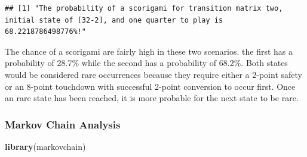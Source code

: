 \documentclass[
]{article}
\newenvironment{Shaded}{\begin{snugshade}}{\end{snugshade}}
\newcommand{\CommentTok}[1]{\textcolor[rgb]{0.56,0.35,0.01}{\textit{#1}}}
\newcommand{\DataTypeTok}[1]{\textcolor[rgb]{0.13,0.29,0.53}{#1}}
\newcommand{\DecValTok}[1]{\textcolor[rgb]{0.00,0.00,0.81}{#1}}
\newcommand{\KeywordTok}[1]{\textcolor[rgb]{0.13,0.29,0.53}{\textbf{#1}}}
\newcommand{\NormalTok}[1]{#1}
\newcommand{\OperatorTok}[1]{\textcolor[rgb]{0.81,0.36,0.00}{\textbf{#1}}}
\newcommand{\StringTok}[1]{\textcolor[rgb]{0.31,0.60,0.02}{#1}}
\begin{document}
\begin{Shaded}
\end{Shaded}

\begin{verbatim}
## [1] "The probability of a scorigami for transition matrix two, initial state of [32-2], and one quarter to play is 68.2218786498776%!"
\end{verbatim}

The chance of a scorigami are fairly high in these two scenarios. the
first has a probability of 28.7\% while the second has a probability of
68.2\%. Both states would be considered rare occurrences because they
require either a 2-point safety or an 8-point touchdown with successful
2-point conversion to occur first. Once an rare state has been reached,
it is more probable for the next state to be rare.

\hypertarget{markov-chain-analysis}{%
\subsubsection{Markov Chain Analysis}\label{markov-chain-analysis}}

\begin{Shaded}
\begin{Highlighting}[]
\KeywordTok{library}\NormalTok{(markovchain)}
\end{Highlighting}
\end{Shaded}
\end{document}
